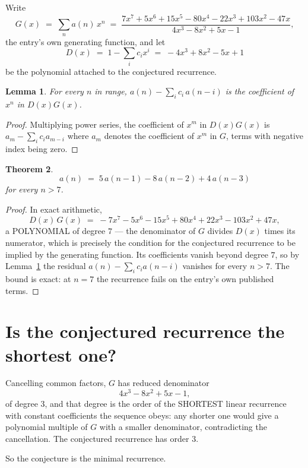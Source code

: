 \documentclass[11pt,a4paper]{article}
\theoremstyle{plain}
\newtheorem{theorem}{Theorem}
\newtheorem{lemma}[theorem]{Lemma}
\theoremstyle{definition}
\begin{document}
Write
\[
G(x)\;=\;\sum_{n}a(n)\,x^{n}\;=\;\frac{7 x^{7} + 5 x^{6} + 15 x^{5} - 80 x^{4} - 22 x^{3} + 103 x^{2} - 47 x}{4 x^{3} - 8 x^{2} + 5 x - 1},
\]
the entry's own generating function, and let
\[
D(x)\;=\;1-\sum_i c_i x^{i}\;=\;- 4 x^{3} + 8 x^{2} - 5 x + 1
\]
be the polynomial attached to the conjectured recurrence.

\begin{lemma}\label{lem:key}
For every $n$ in range, $a(n)-\sum_i c_i\,a(n-i)$ is the coefficient of $x^{n}$ in
$D(x)G(x)$.
\end{lemma}

\begin{proof}
Multiplying power series, the coefficient of $x^{m}$ in $D(x)G(x)$ is
$a_m-\sum_i c_i a_{m-i}$ where $a_m$ denotes the coefficient of $x^{m}$ in $G$, terms with
negative index being zero.
\end{proof}

\begin{theorem}
\[
a(n)\;=\;5\,a(n-1) - 8\,a(n-2) + 4\,a(n-3)
\]
for every $n>7$.
\end{theorem}

\begin{proof}
In exact arithmetic,
\[
D(x)\,G(x)\;=\;- 7 x^{7} - 5 x^{6} - 15 x^{5} + 80 x^{4} + 22 x^{3} - 103 x^{2} + 47 x,
\]
a POLYNOMIAL of degree $7$ --- the denominator of $G$ divides $D(x)$ times its numerator,
which is precisely the condition for the conjectured recurrence to be implied by the
generating function. Its coefficients vanish beyond degree $7$, so by
Lemma~\ref{lem:key} the residual $a(n)-\sum_ic_ia(n-i)$ vanishes for every
$n>7$. The bound is exact: at $n=7$ the recurrence fails on the entry's own published terms.
\end{proof}

\section{Is the conjectured recurrence the shortest one?}

Cancelling common factors, $G$ has reduced denominator
\[
4 x^{3} - 8 x^{2} + 5 x - 1,
\]
of degree $3$, and that degree is the order of the SHORTEST linear recurrence with
constant coefficients the sequence obeys: any shorter one would give a polynomial multiple of
$G$ with a smaller denominator, contradicting the cancellation. The conjectured recurrence has
order $3$.

So the conjecture is the minimal recurrence.
\end{document}

